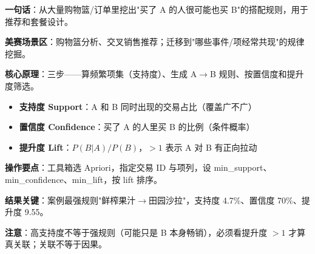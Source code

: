 \begin{algobrief}
\textbf{一句话}：从大量购物篮/订单里挖出"买了 A 的人很可能也买 B"的搭配规则，用于推荐和套餐设计。

\textbf{美赛场景区}：购物篮分析、交叉销售推荐；迁移到"哪些事件/项经常共现"的规律挖掘。

\textbf{核心原理}：三步——算频繁项集（支持度）、生成 A$\to$B 规则、按置信度和提升度筛选。
\begin{itemize}
    \item \textbf{支持度 Support}：A 和 B 同时出现的交易占比（覆盖广不广）
    \item \textbf{置信度 Confidence}：买了 A 的人里买 B 的比例（条件概率）
    \item \textbf{提升度 Lift}：$P(B|A)/P(B)$，$>1$ 表示 A 对 B 有正向拉动
\end{itemize}

\textbf{操作要点}：工具箱选 Apriori，指定交易 ID 与项列，设 min\_support、min\_confidence、min\_lift，按 lift 排序。

\textbf{结果关键}：案例最强规则"鲜榨果汁$\to$田园沙拉"，支持度 4.7\%、置信度 70\%、提升度 9.55。

\textbf{注意}：高支持度不等于强规则（可能只是 B 本身畅销），必须看提升度 $>1$ 才算真关联；关联不等于因果。
\end{algobrief}

